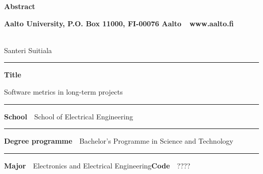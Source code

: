 
\newpage
{}
{}


\begin{spacing}{.88}

{\parindent0pt %

{\fontsize{13.9pt}{13.9pt}\selectfont
\vspace{-8.9mm}\hfill{\bfseries\sffamily\lsstyle Abstract}}

{\fontsize{9.48pt}{9.48pt}\selectfont
\vspace{.9mm}\hfill{\bfseries\sffamily\lsstyle Aalto University, P.O. Box 11000, FI-00076 Aalto~~\textcolor{aaltoGray}{www.aalto.fi}}}

\\
{\small Santeri Suitiala}

\vspace{-2.4mm}\rule{\textwidth}{.75pt}

{\fontsize{10.5pt}{10.5pt}\bfseries\sffamily\lsstyle Title}\\
\parbox[t]{\textwidth}{\raggedright\small Software metrics in long-term projects}

\vspace{.5mm}\rule{\textwidth}{.75pt}

{\fontsize{10.5pt}{10.5pt}\bfseries\sffamily\lsstyle School}~~{\small School of Electrical Engineering}

\vspace{-2.4mm}\rule{\textwidth}{.75pt}

{\fontsize{10.5pt}{10.5pt}\bfseries\sffamily\lsstyle Degree programme}~~{\small Bachelor’s Programme in Science and Technology}

\vspace{-2.4mm}\rule{\textwidth}{.75pt}

{\fontsize{10.5pt}{10.5pt}\bfseries\sffamily\lsstyle Major}~~{\small Electronics and Electrical Engineering}\hfill{\fontsize{10.5pt}{10.5pt}\bfseries\sffamily\lsstyle Code}~~{\small ????}

}
\end{spacing}
